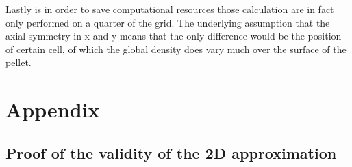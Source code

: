 \documentclass[11pt,a4paper]{article}
\begin{document}
Lastly is in order to save computational resources those calculation are in fact only performed on a quarter of the grid. The underlying assumption that the axial symmetry in x and y means that the only difference would be the position of certain cell, of which the global density does vary much over the surface of the pellet.


\section*{Appendix}
\subsection{Proof of the validity of the 2D approximation}
\newpage


\end{document}
